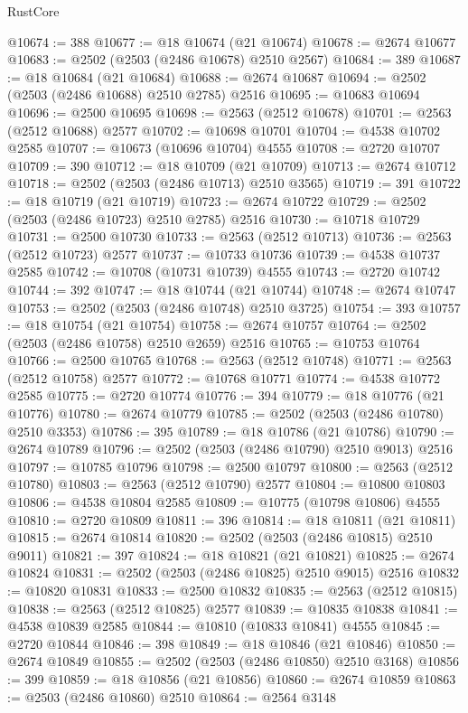 \begin{lexlean}{RustCore}
\begin{coremodule}
@10674 := 388
@10677 := @18 @10674 (@21 @10674)
@10678 := @2674 @10677
@10683 := @2502 (@2503 (@2486 @10678) @2510 @2567)
@10684 := 389
@10687 := @18 @10684 (@21 @10684)
@10688 := @2674 @10687
@10694 := @2502 (@2503 (@2486 @10688) @2510 @2785) @2516
@10695 := @10683 @10694
@10696 := @2500 @10695
@10698 := @2563 (@2512 @10678)
@10701 := @2563 (@2512 @10688) @2577
@10702 := @10698 @10701
@10704 := @4538 @10702 @2585
@10707 := @10673 (@10696 @10704) @4555
@10708 := @2720 @10707
@10709 := 390
@10712 := @18 @10709 (@21 @10709)
@10713 := @2674 @10712
@10718 := @2502 (@2503 (@2486 @10713) @2510 @3565)
@10719 := 391
@10722 := @18 @10719 (@21 @10719)
@10723 := @2674 @10722
@10729 := @2502 (@2503 (@2486 @10723) @2510 @2785) @2516
@10730 := @10718 @10729
@10731 := @2500 @10730
@10733 := @2563 (@2512 @10713)
@10736 := @2563 (@2512 @10723) @2577
@10737 := @10733 @10736
@10739 := @4538 @10737 @2585
@10742 := @10708 (@10731 @10739) @4555
@10743 := @2720 @10742
@10744 := 392
@10747 := @18 @10744 (@21 @10744)
@10748 := @2674 @10747
@10753 := @2502 (@2503 (@2486 @10748) @2510 @3725)
@10754 := 393
@10757 := @18 @10754 (@21 @10754)
@10758 := @2674 @10757
@10764 := @2502 (@2503 (@2486 @10758) @2510 @2659) @2516
@10765 := @10753 @10764
@10766 := @2500 @10765
@10768 := @2563 (@2512 @10748)
@10771 := @2563 (@2512 @10758) @2577
@10772 := @10768 @10771
@10774 := @4538 @10772 @2585
@10775 := @2720 @10774
@10776 := 394
@10779 := @18 @10776 (@21 @10776)
@10780 := @2674 @10779
@10785 := @2502 (@2503 (@2486 @10780) @2510 @3353)
@10786 := 395
@10789 := @18 @10786 (@21 @10786)
@10790 := @2674 @10789
@10796 := @2502 (@2503 (@2486 @10790) @2510 @9013) @2516
@10797 := @10785 @10796
@10798 := @2500 @10797
@10800 := @2563 (@2512 @10780)
@10803 := @2563 (@2512 @10790) @2577
@10804 := @10800 @10803
@10806 := @4538 @10804 @2585
@10809 := @10775 (@10798 @10806) @4555
@10810 := @2720 @10809
@10811 := 396
@10814 := @18 @10811 (@21 @10811)
@10815 := @2674 @10814
@10820 := @2502 (@2503 (@2486 @10815) @2510 @9011)
@10821 := 397
@10824 := @18 @10821 (@21 @10821)
@10825 := @2674 @10824
@10831 := @2502 (@2503 (@2486 @10825) @2510 @9015) @2516
@10832 := @10820 @10831
@10833 := @2500 @10832
@10835 := @2563 (@2512 @10815)
@10838 := @2563 (@2512 @10825) @2577
@10839 := @10835 @10838
@10841 := @4538 @10839 @2585
@10844 := @10810 (@10833 @10841) @4555
@10845 := @2720 @10844
@10846 := 398
@10849 := @18 @10846 (@21 @10846)
@10850 := @2674 @10849
@10855 := @2502 (@2503 (@2486 @10850) @2510 @3168)
@10856 := 399
@10859 := @18 @10856 (@21 @10856)
@10860 := @2674 @10859
@10863 := @2503 (@2486 @10860) @2510
@10864 := @2564 @3148

\end{coremodule}
\end{lexlean}

